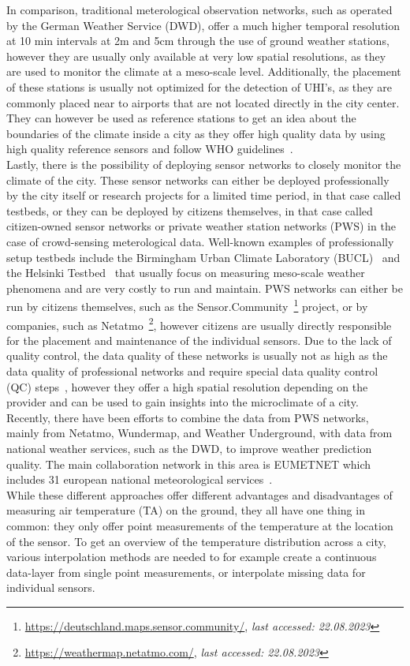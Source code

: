 In comparison, traditional meterological observation networks, such as operated by the German Weather Service (DWD), offer a much higher temporal resolution at 10 min intervals at 2m and 5cm through the use of ground weather stations, however they are usually only available at very low spatial resolutions, as they are used to monitor the climate at a meso-scale level. Additionally, the placement of these stations is usually not optimized for the detection of UHI's, as they are commonly placed near to airports that are not located directly in the city center. They can however be used as reference stations to get an idea about the boundaries of the climate inside a city as they offer high quality data by using high quality reference sensors and follow WHO guidelines~\cite{oke2006guideline}.\\
Lastly, there is the possibility of deploying sensor networks to closely monitor the climate of the city. These sensor networks can either be deployed professionally by the city itself or research projects for a limited time period, in that case called testbeds, or they can be deployed by citizens themselves, in that case called citizen-owned sensor networks or private weather station networks (PWS) in the case of crowd-sensing meterological data. Well-known examples of professionally setup testbeds include the Birmingham Urban Climate Laboratory (BUCL)~\cite{chapman2015birmingham} and the Helsinki Testbed~\cite{koskinen2011helsinki} that usually focus on measuring meso-scale weather phenomena and are very costly to run and maintain.
PWS networks can either be run by citizens themselves, such as the Sensor.Community~\footnote{\url{https://deutschland.maps.sensor.community/}, \textit{last accessed: 22.08.2023}} project, or by companies, such as Netatmo~\footnote{\url{https://weathermap.netatmo.com/}, \textit{last accessed: 22.08.2023}}, however citizens are usually directly responsible for the placement and maintenance of the individual sensors. Due to the lack of quality control, the data quality of these networks is usually not as high as the data quality of professional networks and require special data quality control (QC) steps~\cite{fenner2021crowdqc+, meier2017crowdsourcing}, however they offer a high spatial resolution depending on the provider and can be used to gain insights into the microclimate of a city. Recently, there have been efforts to combine the data from PWS networks, mainly from Netatmo, Wundermap, and Weather Underground, with data from national weather services, such as the DWD, to improve weather prediction quality. The main collaboration network in this area is EUMETNET which includes 31 european national meteorological services~\cite{hahn2022observations}.\\
While these different approaches offer different advantages and disadvantages of measuring air temperature (TA) on the ground, they all have one thing in common: they only offer point measurements of the temperature at the location of the sensor. To get an overview of the temperature distribution across a city, various interpolation methods are needed to for example create a continuous data-layer from single point measurements, or interpolate missing data for individual sensors.

